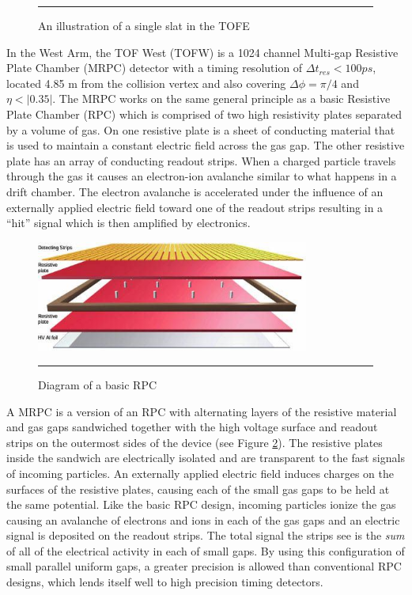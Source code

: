 \begin{figure}[htbp]
  \centering
    \rule{35em}{0.5pt}
  \caption[An illustration of a single slat in the TOFE]{An illustration of a single slat in the TOFE}
  \label{fig:TOFEcartoon}
\end{figure}

In the West Arm, the TOF West (TOFW) is a 1024 channel Multi-gap Resistive Plate Chamber (MRPC) detector with a timing resolution of $\Delta t_{res} < 100 ps$, located 4.85 m from the collision vertex and also covering $\Delta\phi = \pi / 4$ and $\eta < |0.35|$. The MRPC works on the same general principle as a basic Resistive Plate Chamber (RPC) which is comprised of two high resistivity plates separated by a volume of gas. On one resistive plate is a sheet of conducting material that is used to maintain a constant electric field across the gas gap. The other resistive plate has an array of conducting readout strips. When a charged particle travels through the gas it causes an electron-ion avalanche similar to what happens in a drift chamber. The electron avalanche is accelerated under the influence of an externally applied electric field toward one of the readout strips resulting in a ``hit'' signal which is then amplified by electronics. 

\begin{figure}[h]
  \centering
    \includegraphics[width=0.8\textwidth]{Figures/RPClayers.jpg}
    \rule{35em}{0.5pt}
  \caption[Diagram of a basic RPC]{Diagram of a basic RPC \citep{CMSRPC}}
  \label{fig:RPCbasic}
\end{figure}

A MRPC is a version of an RPC with alternating layers of the resistive material and gas gaps sandwiched together with the high voltage surface and readout strips on the outermost sides of the device \citep{Akindinov:2000rq} (see Figure \ref{fig:RPCbasic}). The resistive plates inside the sandwich are electrically isolated and are transparent to the fast signals of incoming particles. An externally applied electric field induces charges on the surfaces of the resistive plates, causing each of the small gas gaps to be held at the same potential. Like the basic RPC design, incoming particles ionize the gas causing an avalanche of electrons and ions in each of the gas gaps and an electric signal is deposited on the readout strips. The total signal the strips see is the \textit{sum} of all of the electrical activity in each of small gaps. By using this configuration of small parallel uniform gaps, a greater precision is allowed than conventional RPC designs, which lends itself well to high precision timing detectors.

